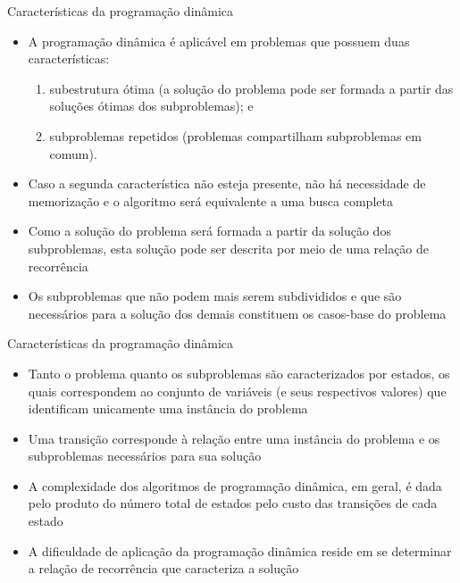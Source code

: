 \begin{frame}[fragile]{Características da programação dinâmica}

    \begin{itemize}
        \item A programação dinâmica é aplicável em problemas que possuem duas características:
        \pause

        \begin{enumerate}
            \item subestrutura ótima (a solução do problema pode ser formada a partir das soluções
                ótimas dos subproblemas); e
        \pause
            \item subproblemas repetidos (problemas compartilham subproblemas em comum).
        \end{enumerate}
        \pause

        \item Caso a segunda característica não esteja presente, não há necessidade de memorização
            e o algoritmo será equivalente a uma busca completa
        \pause

        \item Como a solução do problema será formada a partir da solução dos subproblemas, esta
            solução pode ser descrita por meio de uma relação de recorrência
        \pause

        \item Os subproblemas que não podem mais serem subdivididos e que são necessários para
            a solução dos demais constituem os casos-base do problema
    \end{itemize}

\end{frame}

\begin{frame}[fragile]{Características da programação dinâmica}

    \begin{itemize}
        \item Tanto o problema quanto os subproblemas são caracterizados por estados, os quais
            correspondem ao conjunto de variáveis (e seus respectivos valores) que identificam
            unicamente uma instância do problema
        \pause
        
        \item Uma transição corresponde à relação entre uma instância do problema e os 
            subproblemas necessários para sua solução
        \pause

        \item A complexidade dos algoritmos de programação dinâmica, em geral, é dada pelo
            produto do número total de estados pelo custo das transições de cada estado
        \pause

        \item A dificuldade de aplicação da programação dinâmica reside em se determinar
            a relação de recorrência que caracteriza a solução
    \end{itemize}

\end{frame}

